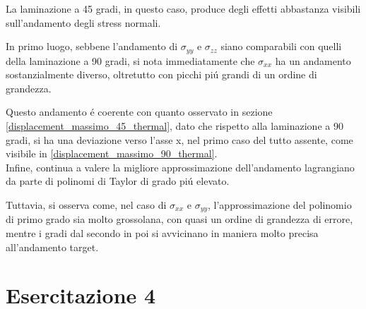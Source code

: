 \documentclass{article}
\begin{document}
            La laminazione a 45 gradi, in questo caso, produce degli effetti abbastanza visibili sull'andamento 
            degli stress normali. 

            In primo luogo, sebbene l'andamento di $\sigma_{yy}$ e $\sigma_{zz}$ siano comparabili con quelli della laminazione a 90 gradi, si nota immediatamente che 
            $\sigma_{xx}$ ha un andamento sostanzialmente diverso, oltretutto con picchi piú grandi di un ordine di grandezza. 

            Questo andamento é coerente con quanto osservato in sezione \ref{displacement_massimo_45_thermal}, dato che rispetto alla laminazione
            a 90 gradi, si ha una deviazione verso l'asse x, nel primo caso del tutto assente, come visibile in \ref{displacement_massimo_90_thermal}. \\ 

            Infine, continua a valere la migliore approssimazione dell'andamento lagrangiano da parte di polinomi di Taylor 
            di grado piú elevato.

            Tuttavia, si osserva come, nel caso di $\sigma_{xx}$ e $\sigma_{yy}$, l'approssimazione del polinomio di primo grado
            sia molto grossolana, con quasi un ordine di grandezza di errore, mentre i gradi dal secondo in poi si avvicinano in maniera
            molto precisa all'andamento target.
            


            \clearpage            
        
        \section{Esercitazione 4\label{Esercitazione4}}

        


                
        \clearpage
        \printbibliography
\end{document}
